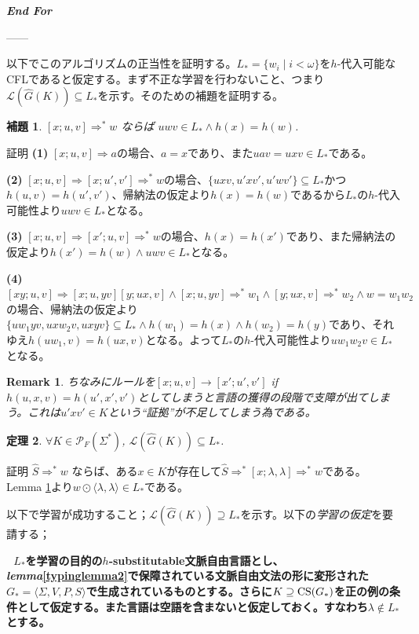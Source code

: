 \documentclass{jsbook}
\newtheorem{theorem}{定理}
\newtheorem{lemma}[theorem]{補題}
\newtheorem{remark}{Remark}
\newenvironment{proof}{証明}
\newlength{\zw}
\begin{document}
\hspace{1\zw}\emph{\bf{End For}}

------

以下でこのアルゴリズムの正当性を証明する。$L_*=\{w_i\mid i<\omega\}$を$h$-代入可能なCFLであると仮定する。まず不正な学習を行わないこと、つまり$\mathcal{L}(\hat{G}(K))\subseteq L_*$を示す。そのための補題を証明する。

\begin{lemma}\label{termlemma:a}
$[x; u,v]\Rightarrow^*w$ ならば $uwv\in L_*\land h(x)=h(w)$.
\end{lemma}

\begin{proof}
{\bf (1)} $[x;u,v]\Rightarrow a$の場合、$a=x$であり、また$uav=uxv\in L_*$である。

{\bf (2)} $[x;u,v]\Rightarrow[x;u',v']\Rightarrow^*w$の場合、$\{uxv,u'xv',u'wv'\}\subseteq L_*$かつ$h(u,v)=h(u',v')$、帰納法の仮定より$h(x)=h(w)$であるから$L_*$の$h$-代入可能性より$uwv\in L_*$となる。

{\bf (3)} $[x;u,v]\Rightarrow[x';u,v]\Rightarrow^*w$の場合、$h(x)=h(x')$であり、また帰納法の仮定より$h(x')=h(w)\land uwv\in L_*$となる。

{\bf (4)}$[xy;u,v]\Rightarrow[x;u,yv][y;ux,v]\land[x;u,yv]\Rightarrow^*w_1\land[y;ux,v]\Rightarrow^*w_2\land w=w_1w_2$の場合、帰納法の仮定より$\{uw_1yv,uxw_2v,uxyv\}\subseteq L_*\land h(w_1)=h(x)\land h(w_2)=h(y)$であり、それゆえ$h(uw_1,v)=h(ux,v)$となる。よって$L_*$の$h$-代入可能性より$uw_1w_2v\in L_*$となる。
\end{proof}

\begin{remark}
ちなみにルールを$[x;u,v]\to[x';u',v']$ if $h(u,x,v)=h(u',x',v')$としてしまうと言語の獲得の段階で支障が出てしまう。これは$u'xv'\in K$という``証拠''が不足してしまう為である。
\end{remark}

\begin{theorem}
$\forall K\in\mathcal{P}_F(\Sigma^*)$, $\mathcal{L}(\hat{G}(K))\subseteq L_*$.
\end{theorem}

\begin{proof}
$\hat{S}\Rightarrow^*w$ ならば、ある$x\in K$が存在して$\hat{S}\Rightarrow^*[x; \lambda,\lambda]\Rightarrow^*w$である。Lemma \ref{termlemma:a}より$w\odot\langle\lambda,\lambda\rangle\in L_*$である。
\end{proof}

\begin{flushleft}
以下で学習が成功すること；$\mathcal{L}(\hat{G}(K))\supseteq L_*$を示す。以下の\emph{学習の仮定}を要請する；

\,\,\,\,{\bf $L_*$を学習の目的の$h$-substitutable文脈自由言語とし、\emph{lemma}\ref{typinglemma2}で保障されている文脈自由文法の形に変形された$G_*=\langle\Sigma,V,P,S\rangle$で生成されているものとする。さらに$K\supseteq {\rm CS}(G_*)$を正の例の条件として仮定する。また言語は空語を含まないと仮定しておく。すなわち$\lambda\notin L_*$とする。}
\end{flushleft}
\end{document}

